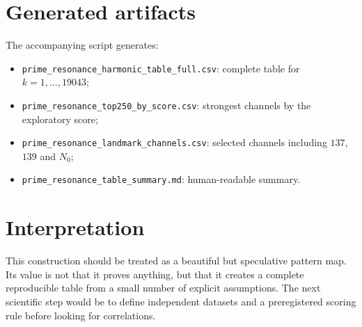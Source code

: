 \documentclass[12pt,a4paper]{article}
\begin{document}
\section{Generated artifacts}
The accompanying script generates:
\begin{itemize}
\item \texttt{prime\_resonance\_harmonic\_table\_full.csv}: complete table for $k=1,\ldots,19043$;
\item \texttt{prime\_resonance\_top250\_by\_score.csv}: strongest channels by the exploratory score;
\item \texttt{prime\_resonance\_landmark\_channels.csv}: selected channels including $137$, $139$ and $N_0$;
\item \texttt{prime\_resonance\_table\_summary.md}: human-readable summary.
\end{itemize}

\section{Interpretation}
This construction should be treated as a beautiful but speculative pattern map.  Its value is not that it proves anything, but that it creates a complete reproducible table from a small number of explicit assumptions.  The next scientific step would be to define independent datasets and a preregistered scoring rule before looking for correlations.
\end{document}
